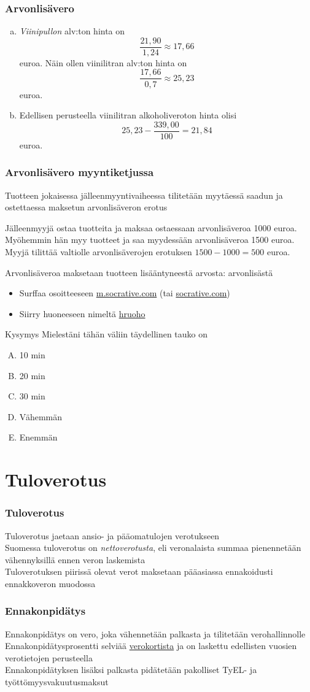 \documentclass[handout]{beamer}
\newcommand{\pblock}{\\ \vspace{0.5cm}\pause}
\newcommand{\socrativeOhje}{
\begin{itemize}
\item Surffaa osoitteeseen \url{m.socrative.com} (tai \url{socrative.com})
\item Siirry huoneeseen nimeltä \url{hruoho}
\end{itemize}
}
\newcommand{\taukoKysymys}{
\socrativeOhje
	\begin{block}{Kysymys}
	Mielestäni tähän väliin täydellinen tauko on
	\begin{enumerate}[(A)]
		\item 10 min
		\item 20 min
		\item 30 min
		\item Vähemmän 
		\item Enemmän
	\end{enumerate}	
	\end{block}
}
\begin{document}
\begin{frame}
\frametitle{Arvonlisävero}

	\begin{ratkaisu}
		\pause
		\begin{enumerate}[(a)]
			\item \emph{Viinipullon} alv:ton hinta on\pause 
				\[
					\frac{21,90}{1,24}\approx 17,66
				\]
				euroa. \pause Näin ollen viinilitran alv:ton hinta on 
				\[
					\frac{17,66}{0,7}\approx 25,23
				\] euroa.\pause
			\item Edellisen perusteella viinilitran alkoholiveroton hinta olisi \pause
				\[
					25,23-\frac{339,00}{100} = 21,84
				\]
				euroa.
		\end{enumerate}
	\end{ratkaisu}
\end{frame}

\begin{frame}
\frametitle{Arvonlisävero myyntiketjussa}

Tuotteen jokaisessa jälleenmyyntivaiheessa tilitetään myytäessä saadun ja  ostettaessa maksetun arvonlisäveron erotus\pause
\begin{esim}
Jälleenmyyjä ostaa tuotteita ja maksaa ostaessaan arvonlisäveroa 1000 euroa.
\pause Myöhemmin hän myy tuotteet ja saa myydessään arvonlisäveroa 1500 euroa.
\pause Myyjä tilittää valtiolle arvonlisäverojen erotuksen \(1500-1000=500\) euroa.
\end{esim}\pause
Arvonlisäveroa maksetaan tuotteen lisääntyneestä arvosta: arvonlisästä
\end{frame}

\begin{frame}
\taukoKysymys
\end{frame}

\section{Tuloverotus}

\begin{frame}
\frametitle{Tuloverotus}
\pause
Tuloverotus jaetaan ansio- ja pääomatulojen verotukseen
\pblock
Suomessa tuloverotus on \emph{nettoverotusta}, eli veronalaista summaa pienennetään vähennyksillä ennen veron laskemista 
\pblock
Tuloverotuksen piirissä olevat verot maksetaan pääasiassa ennakoidusti ennakkoveron muodossa
\end{frame}

\begin{frame}
\frametitle{Ennakonpidätys}
\pause
Ennakonpidätys on vero, joka vähennetään palkasta ja tilitetään verohallinnolle
\pblock
Ennakonpidätysprosentti selviää \href{http://portal.vero.fi/Demo_VKV2015/Sivut/Login.aspx?demoasiakas=d1b73ac40dc9436a86f4b0683cd30d24&culture=fi-FI}{verokortista} ja on laskettu edellisten vuosien verotietojen perusteella
\pblock
Ennakonpidätyksen lisäksi palkasta pidätetään pakolliset TyEL- ja työttömyysvakuutusmaksut
\end{frame}
\end{document}
